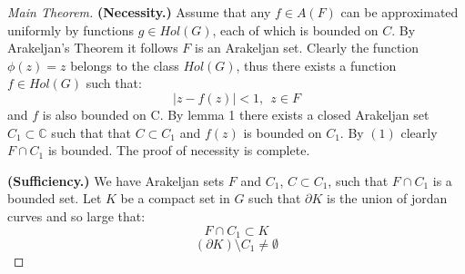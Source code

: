 \documentclass[10pt,a4paper]{amsart}
\begin{document}
\begin{proof}[Main Theorem]


\textbf{(Necessity.)} Assume that any $f\in A(F)$ can be approximated uniformly by functions $g\in Hol(G)$, each of which is bounded on $C$. By Arakeljan's Theorem it follows $F$ is an Arakeljan set. Clearly the function $\phi(z)=z$ belongs to the class $Hol(G)$, thus there exists a function $f\in Hol(G)$ such that: \begin{equation}|z-f(z)|<1,\   \ z\in F  
\end{equation}and $f$ is also bounded on C.
 By {lemma 1} there exists a closed Arakeljan set $C_1\subset \mathbb{C}$ such that that $C\subset C_1$ and $f(z)$ is bounded on $C_1$. By $(1)$ clearly $F\cap C_1$ is bounded. The proof of necessity is complete.
 
 \noindent \textbf{(Sufficiency.)} We have Arakeljan sets $F$ and $C_1$, $C\subset C_1$, such that $F\cap C_1$ is a bounded set. Let $K$ be a compact set in $G$ such that $\partial K$ is the union of jordan curves and so large that:
 \begin{equation} 
  F\cap C_1\subset K
   \end{equation}
  \begin{equation}
  (\partial K)\setminus C_1\not=\emptyset
   \end{equation}


\end{proof}
\end{document}

